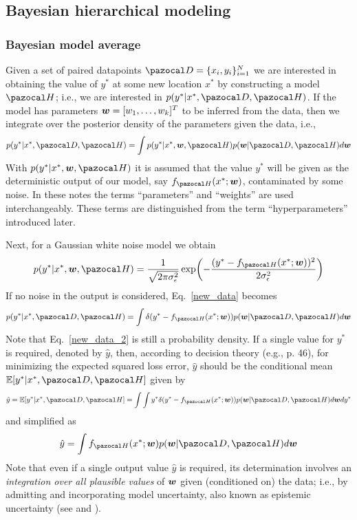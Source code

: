 \subsection{Bayesian hierarchical modeling}\label{sec:hierarchical}

\subsubsection{Bayesian model average}

Given a set of paired datapoints $\cD = \{x_i,y_i\}_{i=1}^{N}$ we are interested in obtaining the value of $y^*$ at some new location $x^*$ by constructing a model $\cH$; i.e., we are interested in $p(y^*|x^*, \cD, \cH)$. 
If the model has parameters $\boldsymbol{w}=[w_1,\dots,w_k]^T$ to be inferred from the data, then we integrate over the posterior density of the parameters given the data, i.e., 
\begin{equation}\label{new_data}
p(y^*|x^*, \cD, \cH) = \int p(y^*|x^*, \bw, \cH)p(\bw|\cD,\cH) d\bw
\end{equation}
With $p(y^*|x^*, \bw, \cH)$ it is assumed that the value $y^*$ will be given as the deterministic output of our model, say $f_{\cH}(x^*;\bw)$, contaminated by some noise. 
In these notes the terms ``parameters'' and ``weights'' are used interchangeably.
These terms are distinguished from the term ``hyperparameters'' introduced later.  

Next, for a Gaussian white noise model we obtain 
\begin{equation}\label{noise_model}
p(y^*|x^*, \bw, \cH) = \frac{1}{\sqrt{2\pi \sigma_{\epsilon}^2}}\exp(-\frac{(y^*-f_{\cH}(x^*;\bw))^2}{2\sigma_{\epsilon}^2})
\end{equation}
If no noise in the output is considered, Eq.~\eqref{new_data} becomes 
\begin{equation}\label{new_data_2}
p(y^*|x^*, \cD, \cH) = \int \delta(y^*-f_{\cH}(x^*;\bw))p(\bw|\cD,\cH) d\bw
\end{equation}
Note that Eq.~\eqref{new_data_2} is still a probability density. 
If a single value for $y^*$ is required, denoted by $\hat{y}$, then, according to decision theory (e.g., \cite{bishop2006pattern} p. 46), for minimizing the expected squared loss error, $\hat{y}$ should be the conditional mean $\mathbb{E}[y^*|x^*, \cD, \cH ]$ given by
\begin{equation}\label{new_data_3}
\hat{y}= \mathbb{E}[y^*|x^*, \cD, \cH ] = \int\int y^*\delta(y^*-f_{\cH}(x^*;\bw))p(\bw|\cD,\cH) d\bw dy^*
\end{equation}
and simplified as 
\begin{equation}\label{new_data_4}
\hat{y}= \int f_{\cH}(x^*;\bw)p(\bw|\cD,\cH) d\bw 
\end{equation}
Note that even if a single output value $\hat{y}$ is required, its determination involves an \textit{integration over all plausible values} of $\boldsymbol{w}$ given (conditioned on) the data; i.e., by admitting and incorporating model uncertainty, also known as epistemic uncertainty (see \cite{gal2016uncertainty} and \cite{kendall2017what}).


